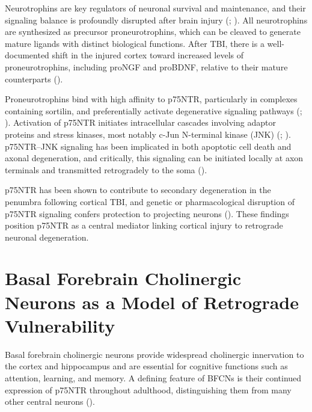 \documentclass[
  letterpaper,
  DIV=11,
  numbers=noendperiod]{scrreprt}
\begin{document}
Neurotrophins are key regulators of neuronal survival and maintenance,
and their signaling balance is profoundly disrupted after brain injury
(;
). All neurotrophins
are synthesized as precursor proneurotrophins, which can be cleaved to
generate mature ligands with distinct biological functions. After TBI,
there is a well-documented shift in the injured cortex toward increased
levels of proneurotrophins, including proNGF and proBDNF, relative to
their mature counterparts ().

Proneurotrophins bind with high affinity to p75NTR, particularly in
complexes containing sortilin, and preferentially activate degenerative
signaling pathways (;
). Activation of p75NTR initiates intracellular cascades involving
adaptor proteins and stress kinases, most notably c-Jun N-terminal
kinase (JNK) (;
). p75NTR--JNK
signaling has been implicated in both apoptotic cell death and axonal
degeneration, and critically, this signaling can be initiated locally at
axon terminals and transmitted retrogradely to the soma
().

p75NTR has been shown to contribute to secondary degeneration in the
penumbra following cortical TBI, and genetic or pharmacological
disruption of p75NTR signaling confers protection to projecting neurons
(). These findings position p75NTR as a central mediator linking
cortical injury to retrograde neuronal degeneration.

\section{Basal Forebrain Cholinergic Neurons as a Model of Retrograde
Vulnerability}\label{basal-forebrain-cholinergic-neurons-as-a-model-of-retrograde-vulnerability}

Basal forebrain cholinergic neurons provide widespread cholinergic
innervation to the cortex and hippocampus and are essential for
cognitive functions such as attention, learning, and memory. A defining
feature of BFCNs is their continued expression of p75NTR throughout
adulthood, distinguishing them from many other central neurons
().
\end{document}
